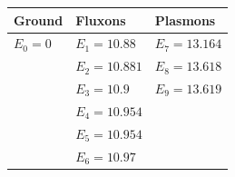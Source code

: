 \documentclass[10pt]{beamer}
\begin{document}
\begin{frame}[shrink=10]
\begin{minipage}[c]{0.49\linewidth}
\begin{table}[H]
	\footnotesize
	\centering
	\begin{tabular}{l l l}
		\hline
		Ground 		& Fluxons 			& Plasmons \\
		\hline
		$E_0 = 0$ 	& $E_1 = 10.88$		& $E_7 = 13.164$ \\
					& $E_2 = 10.881$ 	& $E_8 = 13.618$ \\
					& $E_3 = 10.9$		& $E_9 = 13.619$ \\
					& $E_4 = 10.954$ 	& \\
					& $E_5 = 10.954$ 	& \\
					& $E_6 = 10.97$		& \\
		\hline
	\end{tabular}
\end{table}
\end{minipage}
\begin{minipage}[c]{0.49\linewidth}
\begin{figure}
	\centering
\end{figure}
\end{minipage} 

\end{frame}
\end{document}
